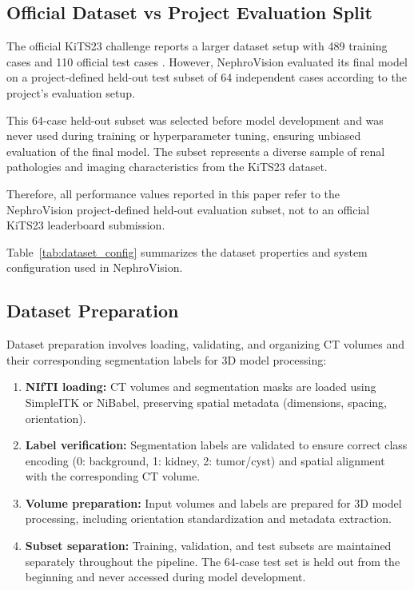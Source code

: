 \subsection{Official Dataset vs Project Evaluation Split}

The official KiTS23 challenge reports a larger dataset setup with 489 training cases and 110 official test cases \cite{kits23}. However, NephroVision evaluated its final model on a project-defined held-out test subset of 64 independent cases according to the project's evaluation setup.

This 64-case held-out subset was selected before model development and was never used during training or hyperparameter tuning, ensuring unbiased evaluation of the final model. The subset represents a diverse sample of renal pathologies and imaging characteristics from the KiTS23 dataset.

Therefore, all performance values reported in this paper refer to the NephroVision project-defined held-out evaluation subset, not to an official KiTS23 leaderboard submission.



Table~\ref{tab:dataset_config} summarizes the dataset properties and system configuration used in NephroVision.

\subsection{Dataset Preparation}

Dataset preparation involves loading, validating, and organizing CT volumes and their corresponding segmentation labels for 3D model processing:

\begin{enumerate}
    \item \textbf{NIfTI loading:} CT volumes and segmentation masks are loaded using SimpleITK or NiBabel, preserving spatial metadata (dimensions, spacing, orientation).
    \item \textbf{Label verification:} Segmentation labels are validated to ensure correct class encoding (0: background, 1: kidney, 2: tumor/cyst) and spatial alignment with the corresponding CT volume.
    \item \textbf{Volume preparation:} Input volumes and labels are prepared for 3D model processing, including orientation standardization and metadata extraction.
    \item \textbf{Subset separation:} Training, validation, and test subsets are maintained separately throughout the pipeline. The 64-case test set is held out from the beginning and never accessed during model development.
\end{enumerate}

